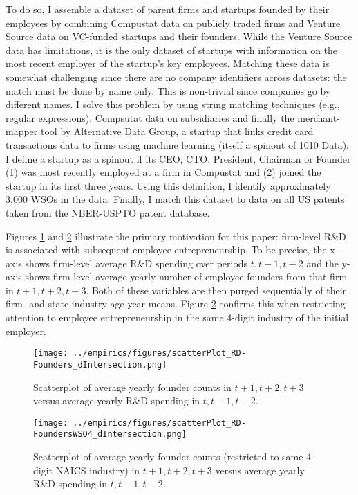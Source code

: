 \documentclass[11pt,english]{article}
\theoremstyle{remark}
\begin{document}
To do so, I assemble a dataset of parent firms and startups founded by their employees by combining Compustat data on publicly traded firms and Venture Source data on VC-funded startups and their founders. While the Venture Source data has limitations, it is the only dataset of startups with information on the most recent employer of the startup's key employees. Matching these data is somewhat challenging since there are no company identifiers across datasets: the match must be done by name only. This is non-trivial since companies go by different names. I solve this problem by using string matching techniques (e.g., regular expressions), Compsutat data on subsidiaries and finally the merchant-mapper tool by Alternative Data Group, a startup that links credit card transactions data to firms using machine learning (itself a spinout of 1010 Data). I define a startup as a spinout if its CEO, CTO, President, Chairman or Founder (1) was most recently employed at a firm in Compustat and (2) joined the startup in its first three years. Using this definition, I identify approximately 3,000 WSOs in the data. Finally, I match this dataset to data on all US patents taken from the NBER-USPTO patent database.

Figures \ref{figure:scatterPlot_RD-Founders_dIntersection} and \ref{figure:scatterPlot_RD-FoundersWSO4_dIntersection} illustrate the primary motivation for this paper: firm-level R\&D is associated with subsequent employee entrepreneurship. To be precise, the x-axis shows firm-level average R\&D spending over periods $t,t-1,t-2$ and the y-axis shows firm-level average yearly number of employee founders from that firm in $t+1,t+2,t+3$. Both of these variables are then purged sequentially of their firm- and state-industry-age-year means. Figure \ref{figure:scatterPlot_RD-FoundersWSO4_dIntersection} confirms this when restricting attention to employee entrepreneurship in the same 4-digit industry of the initial employer. 

\begin{figure}[]
	\centering
	\texttt{[image: ../empirics/figures/scatterPlot\_RD-Founders\_dIntersection.png]}
	\caption{Scatterplot of average yearly founder counts in $t+1,t+2,t+3$ versus average yearly R\&D spending in $t,t-1,t-2$.}
	\label{figure:scatterPlot_RD-Founders_dIntersection}
\end{figure}

\begin{figure}[]
	\centering
	\texttt{[image: ../empirics/figures/scatterPlot\_RD-FoundersWSO4\_dIntersection.png]}
	\caption{Scatterplot of average yearly founder counts (restricted to same 4-digit NAICS industry) in $t+1,t+2,t+3$ versus average yearly R\&D spending in $t,t-1,t-2$.}
	\label{figure:scatterPlot_RD-FoundersWSO4_dIntersection}
\end{figure}
\end{document}

